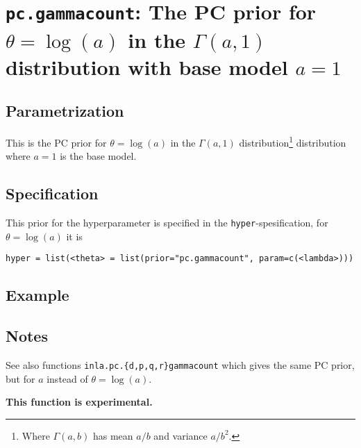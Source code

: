 \documentclass[a4paper,11pt]{article}
\begin{document}
\section*{\texttt{pc.gammacount}: The PC prior for $\theta = \log(a)$
    in the $\Gamma(a,1)$ distribution with base model $a=1$}

\subsection*{Parametrization}

This is the PC prior for $\theta = \log(a)$ in the $\Gamma(a,1)$
distribution\footnote{Where $\Gamma(a,b)$ has mean $a/b$ and variance
    $a/b^{2}$.} distribution where $a=1$ is the base model.

\subsection*{Specification}
This prior for the hyperparameter is specified in the
\texttt{hyper}-spesification, for $\theta = \log(a)$ it is
\begin{center}
    \texttt{hyper = list(<theta> = list(prior="pc.gammacount", param=c(<lambda>)))}
\end{center}

\subsection*{Example}

\subsection*{Notes}

See also functions \texttt{inla.pc.\{d,p,q,r\}gammacount} which gives the
same PC prior, but for $a$ instead of $\theta = \log(a)$.

\noindent\textbf{This function is experimental.}
\end{document}
